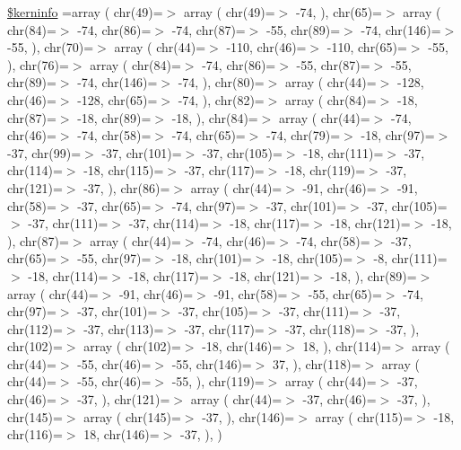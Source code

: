 \begin{DoxyCompactItemize}
\hyperlink{chelveticabi_8php_ab4bb7d3b0332c517f6a42a1924f01000}{\$kerninfo} =array ( chr(49)=$>$ array ( chr(49)=$>$ -\/74, ), chr(65)=$>$ array ( chr(84)=$>$ -\/74, chr(86)=$>$ -\/74, chr(87)=$>$ -\/55, chr(89)=$>$ -\/74, chr(146)=$>$ -\/55, ), chr(70)=$>$ array ( chr(44)=$>$ -\/110, chr(46)=$>$ -\/110, chr(65)=$>$ -\/55, ), chr(76)=$>$ array ( chr(84)=$>$ -\/74, chr(86)=$>$ -\/55, chr(87)=$>$ -\/55, chr(89)=$>$ -\/74, chr(146)=$>$ -\/74, ), chr(80)=$>$ array ( chr(44)=$>$ -\/128, chr(46)=$>$ -\/128, chr(65)=$>$ -\/74, ), chr(82)=$>$ array ( chr(84)=$>$ -\/18, chr(87)=$>$ -\/18, chr(89)=$>$ -\/18, ), chr(84)=$>$ array ( chr(44)=$>$ -\/74, chr(46)=$>$ -\/74, chr(58)=$>$ -\/74, chr(65)=$>$ -\/74, chr(79)=$>$ -\/18, chr(97)=$>$ -\/37, chr(99)=$>$ -\/37, chr(101)=$>$ -\/37, chr(105)=$>$ -\/18, chr(111)=$>$ -\/37, chr(114)=$>$ -\/18, chr(115)=$>$ -\/37, chr(117)=$>$ -\/18, chr(119)=$>$ -\/37, chr(121)=$>$ -\/37, ), chr(86)=$>$ array ( chr(44)=$>$ -\/91, chr(46)=$>$ -\/91, chr(58)=$>$ -\/37, chr(65)=$>$ -\/74, chr(97)=$>$ -\/37, chr(101)=$>$ -\/37, chr(105)=$>$ -\/37, chr(111)=$>$ -\/37, chr(114)=$>$ -\/18, chr(117)=$>$ -\/18, chr(121)=$>$ -\/18, ), chr(87)=$>$ array ( chr(44)=$>$ -\/74, chr(46)=$>$ -\/74, chr(58)=$>$ -\/37, chr(65)=$>$ -\/55, chr(97)=$>$ -\/18, chr(101)=$>$ -\/18, chr(105)=$>$ -\/8, chr(111)=$>$ -\/18, chr(114)=$>$ -\/18, chr(117)=$>$ -\/18, chr(121)=$>$ -\/18, ), chr(89)=$>$ array ( chr(44)=$>$ -\/91, chr(46)=$>$ -\/91, chr(58)=$>$ -\/55, chr(65)=$>$ -\/74, chr(97)=$>$ -\/37, chr(101)=$>$ -\/37, chr(105)=$>$ -\/37, chr(111)=$>$ -\/37, chr(112)=$>$ -\/37, chr(113)=$>$ -\/37, chr(117)=$>$ -\/37, chr(118)=$>$ -\/37, ), chr(102)=$>$ array ( chr(102)=$>$ -\/18, chr(146)=$>$ 18, ), chr(114)=$>$ array ( chr(44)=$>$ -\/55, chr(46)=$>$ -\/55, chr(146)=$>$ 37, ), chr(118)=$>$ array ( chr(44)=$>$ -\/55, chr(46)=$>$ -\/55, ), chr(119)=$>$ array ( chr(44)=$>$ -\/37, chr(46)=$>$ -\/37, ), chr(121)=$>$ array ( chr(44)=$>$ -\/37, chr(46)=$>$ -\/37, ), chr(145)=$>$ array ( chr(145)=$>$ -\/37, ), chr(146)=$>$ array ( chr(115)=$>$ -\/18, chr(116)=$>$ 18, chr(146)=$>$ -\/37, ), )
\end{DoxyCompactItemize}


